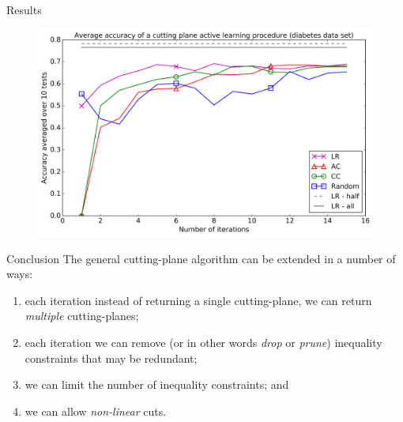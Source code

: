 \documentclass[pdf, 12pt]
{beamer}
\theoremstyle{definition}
\theoremstyle{remark}
\begin{document}
\begin{frame}{Results}
            \begin{figure}[h]
            \includegraphics[width=\linewidth]{figures/diabetes_experiment.png}
        \end{figure}
\end{frame}

\begin{frame}{Conclusion}
      The general cutting-plane algorithm can be extended in a number of ways:
          \begin{enumerate}
        \item each iteration instead of returning a single cutting-plane, we can return \emph{ multiple} cutting-planes;
        \item each iteration we can remove (or in other words \emph{drop} or \emph{prune}) inequality constraints that may be redundant;
        \item we can limit the number of inequality constraints; and
        \item we can allow \emph{non-linear} cuts.
    \end{enumerate}

\end{frame}
\end{document}
